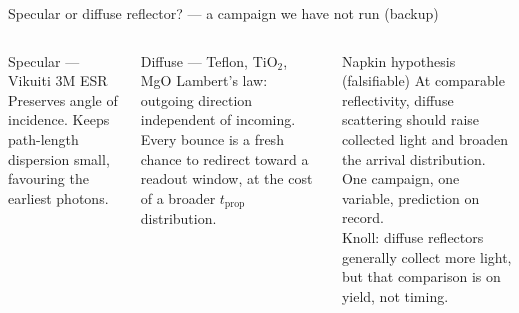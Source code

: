 \documentclass[aspectratio=169,9pt]{beamer}
\begin{document}
\begin{frame}{Specular or diffuse reflector? — a campaign we have not run (backup)}
  \begin{columns}[T]
      \begin{block}{Specular — Vikuiti 3M ESR}
        {\small Preserves angle of incidence.  Keeps path-length dispersion
        small, favouring the earliest photons.}
      \end{block}
      \begin{block}{Diffuse — Teflon, TiO$_2$, MgO}
        {\small Lambert's law: outgoing direction independent of incoming.
        Every bounce is a fresh chance to redirect toward a readout window,
        at the cost of a broader $t_{\mathrm{prop}}$ distribution.}
      \end{block}
      \begin{alertblock}{Napkin hypothesis (falsifiable)}
        {\small At comparable reflectivity, diffuse scattering should raise
        collected light and broaden the arrival distribution.
        One campaign, one variable, prediction on record.\\[4pt]
        Knoll: diffuse reflectors generally collect more light,
        but that comparison is on yield, not timing.}
      \end{alertblock}
  \end{columns}
\end{frame}
\end{document}
